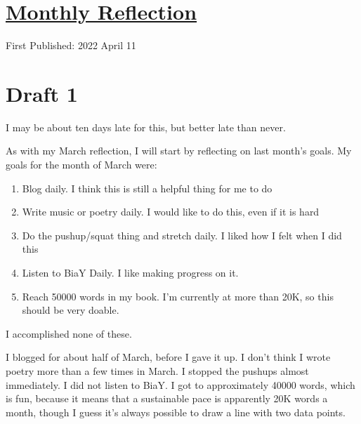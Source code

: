 \documentclass[12pt]{article}[titlepage]
\renewcommand{\,}{\textsuperscript{,}}
\begin{document}
\doublespacing
\section{\href{reflection-april-22.html}{Monthly Reflection}}
First Published: 2022 April 11

\section{Draft 1}
I may be about ten days late for this, but better late than never.

As with my March reflection, I will start by reflecting on last month's goals.
My goals for the month of March were:
\begin{enumerate}
\item Blog daily. I think this is still a helpful thing for me to do
\item Write music or poetry daily. I would like to do this, even if it is hard
\item Do the pushup/squat thing and stretch daily. I liked how I felt when I did this
\item Listen to BiaY Daily. I like making progress on it.
\item Reach 50000 words in my book. I'm currently at more than 20K, so this should be very doable.
\end{enumerate}
I accomplished none of these.

I blogged for about half of March, before I gave it up.
I don't think I wrote poetry more than a few times in March.
I stopped the pushups almost immediately.
I did not listen to BiaY.
I got to approximately 40000 words, which is fun, because it means that a sustainable pace is apparently 20K words a month, though I guess it's always possible to draw a line with two data points.
\end{document}
